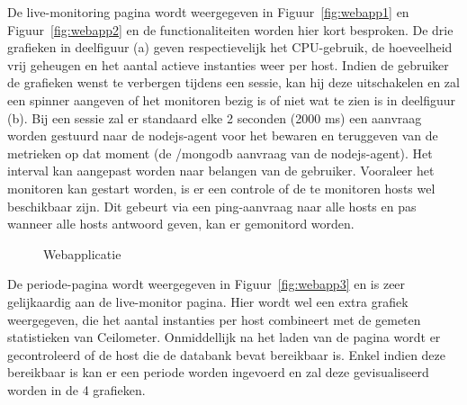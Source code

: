 De live-monitoring pagina wordt weergegeven in Figuur~\ref{fig:webapp1} en Figuur~\ref{fig:webapp2} en de functionaliteiten worden hier kort besproken. De drie grafieken in deelfiguur (a) geven respectievelijk het CPU-gebruik, de hoeveelheid vrij geheugen en het aantal actieve instanties weer per host. Indien de gebruiker de grafieken wenst te verbergen tijdens een sessie, kan hij deze uitschakelen en zal een spinner aangeven of het monitoren bezig is of niet wat te zien is in deelfiguur (b). Bij een sessie zal er standaard elke 2 seconden (2000 ms) een aanvraag worden gestuurd naar de nodejs-agent voor het bewaren en teruggeven van de metrieken op dat moment (de /mongodb aanvraag van de nodejs-agent). Het interval kan aangepast worden naar belangen van de gebruiker. Vooraleer het monitoren kan gestart worden, is er een controle of de te monitoren hosts wel beschikbaar zijn. Dit gebeurt via een ping-aanvraag naar alle hosts en pas wanneer alle hosts antwoord geven, kan er gemonitord worden.

\begin{figure}
\centering
{}\par\medskip
{}\par\medskip
{}
\caption{Webapplicatie}
\label{fig:webapp}
\end{figure}

De periode-pagina wordt weergegeven in Figuur~\ref{fig:webapp3} en is zeer gelijkaardig aan de live-monitor pagina. Hier wordt wel een extra grafiek weergegeven, die het aantal instanties per host combineert met de gemeten statistieken van Ceilometer. Onmiddellijk na het laden van de pagina wordt er gecontroleerd of de host die de databank bevat bereikbaar is. Enkel indien deze bereikbaar is kan er een periode worden ingevoerd en zal deze gevisualiseerd worden in de 4 grafieken.
